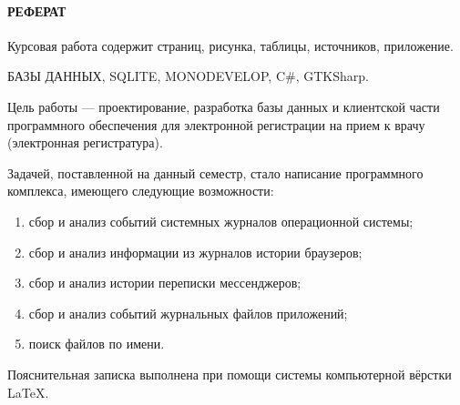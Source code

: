 \newpage
{}
\paragraph{\hfill РЕФЕРАТ \hfill}
Курсовая работа содержит  страниц,  рисунка,  таблицы,  источников,  приложение.

БАЗЫ ДАННЫХ, SQLITE, MONODEVELOP, C#, GTKSharp.

Цель работы --- проектирование, разработка базы данных и клиентской части программного обеспечения для электронной регистрации на прием к врачу (электронная регистратура).

Задачей, поставленной на данный семестр, стало написание программного комплекса, имеющего следующие возможности: 
\begin{enumerate}
\item сбор и анализ событий системных журналов операционной системы;
\item сбор и анализ информации из журналов истории браузеров;
\item сбор и анализ истории переписки мессенджеров;
\item сбор и анализ событий журнальных файлов приложений;
\item поиск файлов по имени.
\end{enumerate}


Пояснительная записка выполнена при помощи системы компьютерной вёрстки \LaTeX.

